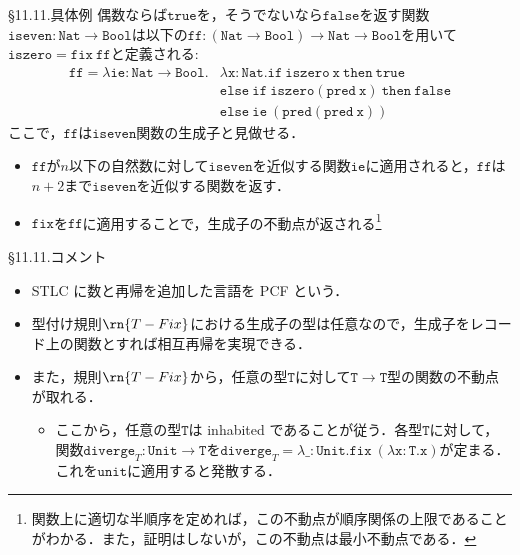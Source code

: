 \documentclass[9pt]{beamer}
\begin{document}
\begin{frame}{\S11.11.具体例}
偶数ならば$\mathtt{true}$を，そうでないなら$\mathtt{false}$を返す関数$\mathtt{iseven:Nat\to Bool}$は以下の$\mathtt{ff:(Nat\to Bool)\to Nat\to Bool}$を用いて$\mathtt{iszero = fix\ ff}$と定義される:\begin{align*}
\mathtt{ff}= \mathtt{\lambda ie:Nat\to Bool.}&\mathtt{\lambda x:Nat. if\ iszero\ x\ then\ true}\\
  &\mathtt{else\ if\ iszero(pred\ x)\ then\ false}\\
&\mathtt{else\ ie\ (pred(pred\ x))}
\end{align*}
ここで，$\mathtt{ff}$は$\mathtt{iseven}$関数の生成子と見做せる．\begin{itemize}
\item $\mathtt{ff}$が$n$以下の自然数に対して$\mathtt{iseven}$を近似する関数$\mathtt{ie}$に適用されると，$\mathtt{ff}$は$n +2$まで$\mathtt{iseven}$を近似する関数を返す．
\item $\mathtt{fix}$を$\mathtt{ff}$に適用することで，生成子の不動点が返される\footnote{関数上に適切な半順序を定めれば，この不動点が順序関係の上限であることがわかる．また，証明はしないが，この不動点は最小不動点である．}
                                                                \end{itemize}
\end{frame}
\begin{frame}{\S11.11.コメント}
\begin{itemize}
\item STLC に数と再帰を追加した言語を PCF という．
\item 型付け規則$\rn{T-Fix}$における生成子の型は任意なので，生成子をレコード上の関数とすれば相互再帰を実現できる．
\item また，規則$\rn{T-Fix}$から，任意の型$\mathtt{T}$に対して$\mathtt{T\to T}$型の関数の不動点が取れる．\begin{itemize}
\item ここから，任意の型$\mathtt{T}$は inhabited であることが従う．各型$\mathtt{T}$に対して，関数$\mathtt{diverge}_{T}:\mathtt{Unit\to T}$を$\mathtt{diverge}_{T} = \mathtt{\lambda \_:Unit.fix\ (\lambda x:T. x)}$が定まる．これを$\mathtt{unit}$に適用すると発散する．
\end{itemize}
\end{itemize}
\end{frame}
\end{document}
